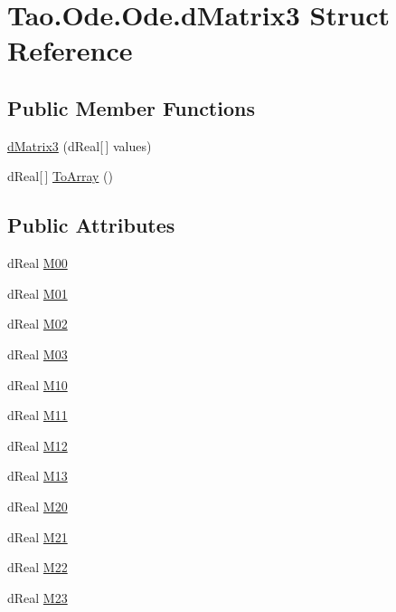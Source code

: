\hypertarget{struct_tao_1_1_ode_1_1_ode_1_1d_matrix3}{
\section{Tao.Ode.Ode.dMatrix3 Struct Reference}
\label{struct_tao_1_1_ode_1_1_ode_1_1d_matrix3}
}
\subsection*{Public Member Functions}
\begin{DoxyCompactItemize}
\item 
\hyperlink{struct_tao_1_1_ode_1_1_ode_1_1d_matrix3_ae9898cb93395a7187c27d834dab65c6b}{dMatrix3} (dReal\mbox{[}$\,$\mbox{]} values)
\item 
dReal\mbox{[}$\,$\mbox{]} \hyperlink{struct_tao_1_1_ode_1_1_ode_1_1d_matrix3_a7220d1179ab976b53b4c0a49b202868f}{ToArray} ()
\end{DoxyCompactItemize}
\subsection*{Public Attributes}
\begin{DoxyCompactItemize}
\item 
dReal \hyperlink{struct_tao_1_1_ode_1_1_ode_1_1d_matrix3_a78a9ff2a3f7f37c6f0f0e3d5b2d5232b}{M00}
\item 
dReal \hyperlink{struct_tao_1_1_ode_1_1_ode_1_1d_matrix3_a987036b9d568d03fda37016861cf5e2a}{M01}
\item 
dReal \hyperlink{struct_tao_1_1_ode_1_1_ode_1_1d_matrix3_a791b18361f28a6f5551be49a5e8f85f3}{M02}
\item 
dReal \hyperlink{struct_tao_1_1_ode_1_1_ode_1_1d_matrix3_ae866cc8eed2a03f3245319e8dfc18300}{M03}
\item 
dReal \hyperlink{struct_tao_1_1_ode_1_1_ode_1_1d_matrix3_a2931cb0bc39557bec9839f2a00aacb0f}{M10}
\item 
dReal \hyperlink{struct_tao_1_1_ode_1_1_ode_1_1d_matrix3_ab4b8b0e0e408689a9a6ca750994ea57d}{M11}
\item 
dReal \hyperlink{struct_tao_1_1_ode_1_1_ode_1_1d_matrix3_adcb3aab1ddc73916b2f7e81641dcc70c}{M12}
\item 
dReal \hyperlink{struct_tao_1_1_ode_1_1_ode_1_1d_matrix3_a4a4988d9088677f2a1b50f42805c2228}{M13}
\item 
dReal \hyperlink{struct_tao_1_1_ode_1_1_ode_1_1d_matrix3_a20a035889d7d4f8838569f4b356632b6}{M20}
\item 
dReal \hyperlink{struct_tao_1_1_ode_1_1_ode_1_1d_matrix3_a076372e2eff2a9ad98d3420edaaf6971}{M21}
\item 
dReal \hyperlink{struct_tao_1_1_ode_1_1_ode_1_1d_matrix3_a7686601598c8222780ae4e74ed9a3d98}{M22}
\item 
dReal \hyperlink{struct_tao_1_1_ode_1_1_ode_1_1d_matrix3_a605d9becb363513d562684e83764b228}{M23}
\end{DoxyCompactItemize}
